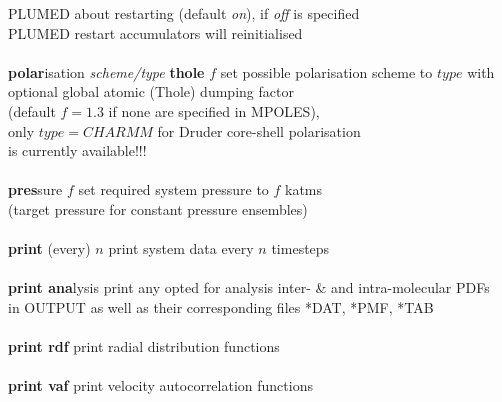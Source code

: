 \begin{tabbing}
\>                                              \> PLUMED about restarting (default {\em on}), if {\em off} is specified \\
\>                                              \> PLUMED restart accumulators will reinitialised \\
\>                                              \> \\
\> {\bf polar}isation {\em scheme/type} {\bf thole} $f$ \> set possible polarisation scheme to $type$ with \\
\>                                              \> optional global atomic (Thole) dumping factor \\
\>                                              \> (default $f=1.3$ if none are specified in MPOLES), \\
\>                                              \> only $type=CHARMM$ for Druder core-shell polarisation \\
\>                                              \> is currently available!!! \\
\>                                              \> \\
\> {\bf pres}sure $f$                           \> set required system pressure to $f$ katms \\
\>                                              \> (target pressure for constant pressure ensembles) \\
\>                                              \> \\
\> {\bf print} (every) $n$                      \> print system data every $n$ timesteps \\
\>                                              \> \\
\> {\bf print ana}lysis                         \> print any opted for analysis inter- \& and intra-molecular PDFs \\
\>                                              \> in OUTPUT as well as their corresponding files *DAT, *PMF, *TAB \\
\>                                              \> \\
\> {\bf print rdf}                              \> print radial distribution functions \\
\>                                              \> \\
\> {\bf print vaf}                              \> print velocity autocorrelation functions \\
\>                                              \> \\

\end{tabbing}
